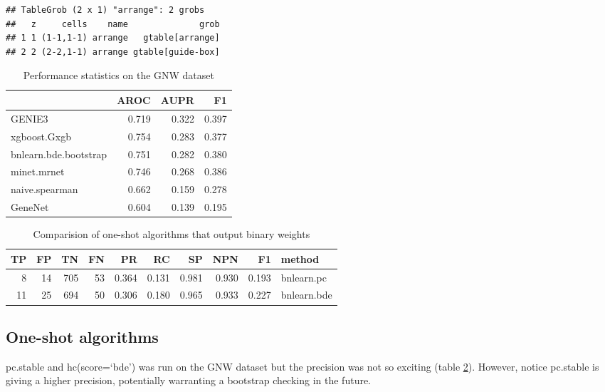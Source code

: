 \documentclass[]{article}
\theoremstyle{definition}
\theoremstyle{definition}
\theoremstyle{definition}
\theoremstyle{remark}
\begin{document}
\begin{verbatim}
## TableGrob (2 x 1) "arrange": 2 grobs
##   z     cells    name              grob
## 1 1 (1-1,1-1) arrange   gtable[arrange]
## 2 2 (2-2,1-1) arrange gtable[guide-box]
\end{verbatim}

\begin{table}

\caption{\label{tab:perf-gnw}Performance statistics on the GNW dataset}
\centering
\begin{tabular}[t]{l|r|r|r}
\hline
  & AROC & AUPR & F1\\
\hline
GENIE3 & 0.719 & 0.322 & 0.397\\
\hline
xgboost.Gxgb & 0.754 & 0.283 & 0.377\\
\hline
bnlearn.bde.bootstrap & 0.751 & 0.282 & 0.380\\
\hline
minet.mrnet & 0.746 & 0.268 & 0.386\\
\hline
naive.spearman & 0.662 & 0.159 & 0.278\\
\hline
GeneNet & 0.604 & 0.139 & 0.195\\
\hline
\end{tabular}
\end{table}

\begin{table}

\caption{\label{tab:one-shot}Comparision of one-shot algorithms that output binary weights}
\centering
\begin{tabular}[t]{r|r|r|r|r|r|r|r|r|l}
\hline
TP & FP & TN & FN & PR & RC & SP & NPN & F1 & method\\
\hline
8 & 14 & 705 & 53 & 0.364 & 0.131 & 0.981 & 0.930 & 0.193 & bnlearn.pc\\
\hline
11 & 25 & 694 & 50 & 0.306 & 0.180 & 0.965 & 0.933 & 0.227 & bnlearn.bde\\
\hline
\end{tabular}
\end{table}

\subsection{One-shot algorithms}\label{one-shot-algorithms}

pc.stable and hc(score=`bde') was run on the GNW dataset but the
precision was not so exciting (table \ref{tab:one-shot}). However,
notice pc.stable is giving a higher precision, potentially warranting a
bootstrap checking in the future.
\end{document}
